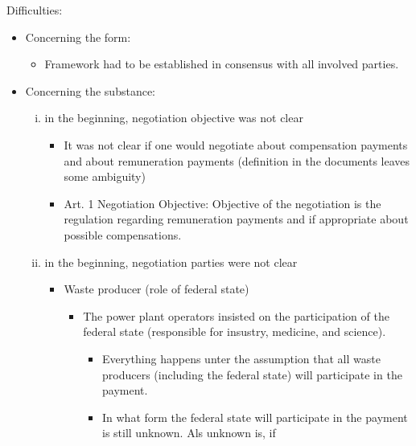 Difficulties:
\begin{itemize}
    \item Concerning the form:
        \begin{itemize}
            \item Framework had to be established in consensus with all
                involved parties.
        \end{itemize}
    \item Concerning the substance:
        \begin{enumerate}[i.]
            \item in the beginning, negotiation objective was not clear
                \begin{itemize}
                    \item It was not clear if one would negotiate about
                        compensation payments and about remuneration payments
                        (definition in the documents leaves some ambiguity)
                    \item Art. 1 Negotiation Objective:
                        Objective of the negotiation is the regulation regarding
                        remuneration payments and if appropriate about possible
                        compensations.
                \end{itemize}
            \item in the beginning, negotiation parties were not clear
                \begin{itemize}
                    \item Waste producer (role of federal state)
                        \begin{itemize}
                            \item The power plant operators insisted on the
                                participation of the federal state (responsible
                                for insustry, medicine, and science).
                                \begin{itemize}
                                    \item Everything happens unter the assumption that
                                        all waste producers (including the federal state)
                                        will participate in the payment.
                                    \item In what form the federal state will participate
                                        in the payment is still unknown. Als unknown is, if

\end{itemize}
\end{itemize}
\end{itemize}
\end{enumerate}
\end{itemize}
